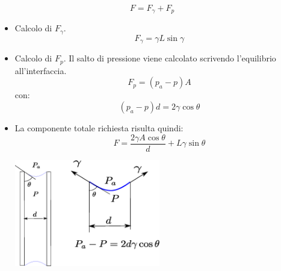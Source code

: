 \begin{equation}
  F = F_\gamma + F_p
\end{equation}

\begin{itemize}
  \item Calcolo di $F_\gamma$.
    \begin{equation}
     F_\gamma = \gamma L \sin\gamma
    \end{equation}
  
  \item Calcolo di $F_p$. Il salto di pressione viene calcolato scrivendo l'equilibrio all'interfaccia.
    \begin{equation}
     F_p = (p_a - p) A
    \end{equation}
    con:
    \begin{equation}
     (p_a - p) d = 2 \gamma \cos \theta
    \end{equation}
   
    
  \item La componente totale richiesta risulta quindi:
  \begin{equation}
    F = \frac{2 \gamma A \cos \theta}{d} + L \gamma \sin \theta
  \end{equation}
  
  \begin{center}
     \includegraphics[width=0.50\textwidth]{./fig/sup01.eps}
   \end{center}
     
\end{itemize}
